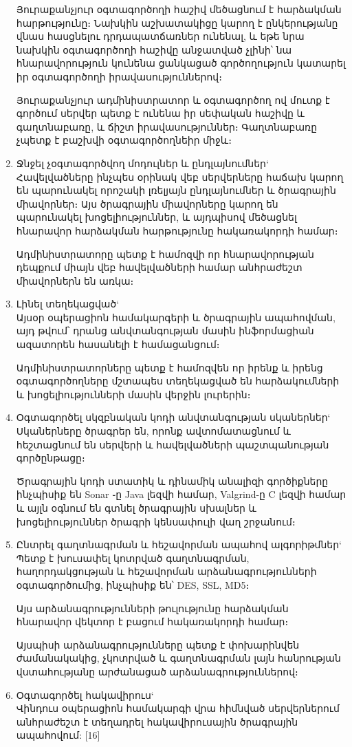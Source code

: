 \documentclass[a4paper,12pt]{article}
\begin{document}
\begin{sloppypar}
\begin{enumerate}
	Յուրաքանչյուր օգտագործողի հաշիվ մեծացնում է հարձակման հարթությունը։
	Նախկին աշխատակիցը կարող է ընկերությանը վնաս հասցնելու դրդապատճառներ
	ունենալ, և եթե նրա նախկին օգտագործողի հաշիվը անջատված չլինի՝
	նա հնարավորություն կունենա ցանկացած գործողություն կատարել
	իր օգտագործողի իրավասություններով։

    Յուրաքանչյուր ադմինիստրատոր և օգտագործող ով մուտք է գործում
    սերվեր պետք է ունենա իր սեփական հաշիվը և գաղտնաբառը, և ճիշտ
    իրավասություններ։ Գաղտնաբառը չպետք է բաշխվի օգտագործողնեիր միջև։
\item Ջնջել չօգտագործվող մոդուլներ և ընդլայնումներ`\\
    Հավելվածները ինչպես օրինակ վեբ սերվերները հաճախ կարող են պարունակել
    որոշակի լռելյայն ընդլայնումներ և ծրագրային միավորներ։
    Այս ծրագրային միավորները կարող են պարունակել խոցելիություններ, և
    այդպիսով մեծացնել հնարավոր հարձակման հարթությունը հակառակորդի համար։

    Ադմինիստրատորը պետք է համոզվի որ հնարավորության դեպքում միայն
    վեբ հավելվածների համար անհրաժեշտ միավորներն են առկա։
\item Լինել տեղեկացված`\\
    Այսօր օպերացիոն համակարգերի և ծրագրային ապահովման,
    այդ թվում՝ դրանց անվտանգության մասին ինֆորմացիան ազատորեն հասանելի է
    համացանցում։

    Ադմինիստրատորները պետք է համոզվեն որ իրենք և իրենց օգտագործողները
    մշտապես տեղեկացված են հարձակումների և խոցելիությունների մասին
    վերջին լուրերին։
\item Օգտագործել սկզբնական կոդի անվտանգության սկաներներ`\\
    Սկաներները ծրագրեր են, որոնք ավտոմատացնում և հեշտացնում են սերվերի
    և հավելվածների պաշտպանության գործընթացը։

    Ծրագրային կոդի ստատիկ և դինամիկ անալիզի գործիքները ինչպիսիք են
    Sonar ֊ը Java լեզվի համար, Valgrind-ը C լեզվի համար և այլն
    օգնում են գտնել ծրագրային սխալներ և խոցելիություններ ծրագրի
    կենսափուլի վաղ շրջանում։
\item Ընտրել գաղտնագրման և հեշավորման ապահով ալգորիթմներ`\\
    Պետք է խուսափել կոտրված գաղտնագրման, հաղորդակցության և
    հեշավորման արձանագրությունների օգտագործումից, ինչպիսիք են՝
	DES, SSL, MD5։

    Այս արձանագրությունների թուլությունը հարձակման հնարավոր
    վեկտոր է բացում հակառակորդի համար։

    Այսպիսի արձանագրությունները պետք է փոխարինվեն ժամանակակից,
    չկոտրված և գաղտնագրման լայն հանրության վստահությանը արժանացած
    արձանագրություններով։
\item Օգտագործել հակավիրուս`\\
	Վինդուս օպերացիոն համակարգի վրա հիմնված սերվերներում անհրաժեշտ է տեղադրել
	հակավիրուսային ծրագրային ապահովում: [16]


\end{enumerate}
\end{sloppypar}
\end{document}
